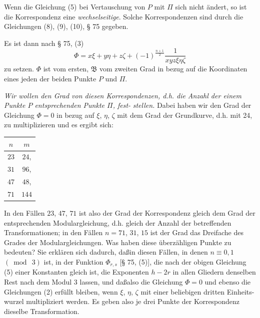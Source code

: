 \documentclass[12pt,a4paper]{article}
\theoremstyle{definition}
\begin{document}
Wenn die Gleichung (5) bei Vertauschung von $P$ mit $\Pi$ sich
nicht \"andert, so ist die Korrespondenz eine \textit{wechselseitige}.
Solche Korrespondenzen sind durch die Gleichungen (8), (9),
(10), \S{} 75 gegeben.

Es ist dann nach \S{} 75, (3)
\begin{equation}\tag{5}
\Phi = x\xi + y\eta + z\zeta + (-1)^{\frac{n+1}{2}} \frac{1}{xyz\xi\eta\zeta}
\end{equation}
zu setzen. $\Phi$ ist vom ersten, $\mathfrak{B}$ vom zweiten Grad in bezug auf
die Koordinaten eines jeden der beiden Punkte $P$ und $\Pi$.

\textit{Wir wollen den Grad von diesen Korrespondenzen, d.h. die}
\textit{Anzahl der einem Punkte $P$ entsprechenden Punkte $\Pi$, fest-}
\textit{stellen.} Dabei haben wir den Grad der Gleichung $\Phi = 0$ in
bezug auf $\xi$, $\eta$, $\zeta$ mit dem Grad der Grundkurve, d.h. mit 24,
zu multiplizieren und es ergibt sich:
\begin{center}
\begin{tabular}{c|c}
$n$ & $m$ \\
\hline
$23$ & $24$, \\
$31$ & $96$, \\
$47$ & $48$, \\
$71$ & $144$ \\
\end{tabular}
\end{center}

In den F\"allen $23$, $47$, $71$ ist also der Grad der Korrespondenz
gleich dem Grad der entsprechenden Modulargleichung, d.h. gleich
der Anzahl der betreffenden Transformationen; in den F\"allen
$n = 71$, $31$, $15$ ist der Grad das Dreifache des Grades der
Modulargleichungen.
Was haben diese \"uberz\"ahligen Punkte zu bedeuten? Sie
erkl\"aren sich dadurch, da\ss in diesen F\"allen, in denen $n \equiv 0, 1$
$(\bmod\ 3)$ ist, in der Funktion $\Phi_{r,s}$ [\S{} 75, (5)], die nach der obigen
Gleichung (5) einer Konstanten gleich ist, die Exponenten $h - 2r$
in allen Gliedern denselben Rest nach dem Modul 3 lassen, und
da\ss also die Gleichung $\Phi = 0$ und ebenso die Gleichungen (2)
erf\"ullt bleiben, wenn $\xi$, $\eta$, $\zeta$ mit einer beliebigen dritten Einheits-
wurzel multipliziert werden. Es geben also je drei Punkte der
Korrespondenz dieselbe Transformation.
\end{document}
